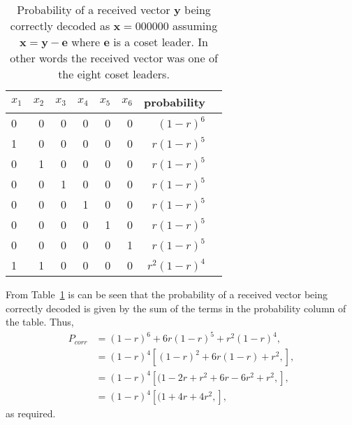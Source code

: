 \begin{table}[!htp]\centering
\begin{tabular}{lrrrrr|rr}\toprule
$x_1$ &$x_2$ &$x_3$ &$x_4$ &$x_5$ &$x_6$ &probability \\\midrule
0 &0 &0 &0 &0 &0 &$(1-r)^6$ \\
1 &0 &0 &0 &0 &0 &$r(1-r)^5$ \\
0 &1 &0 &0 &0 &0 &$r(1-r)^5$ \\
0 &0 &1 &0 &0 &0 &$r(1-r)^5$ \\
0 &0 &0 &1 &0 &0 &$r(1-r)^5$ \\
0 &0 &0 &0 &1 &0 &$r(1-r)^5$ \\
0 &0 &0 &0 &0 &1 &$r(1-r)^5$ \\
1 &1 &0 &0 &0 &0 &$r^2(1-r)^4$ \\
\bottomrule
\end{tabular}
\caption{Probability of a received vector $\bm{y}$ being correctly decoded as $\bm{x}=000000$ assuming $\bm{x} = \bm{y} - \bm{e}$ where $\bm{e}$ is a coset leader. In other words the received vector was one of the eight coset leaders.}
\label{tab:12}
\end{table}

From Table~\ref{tab:12} is can be seen that the probability of a received vector being correctly decoded is given by the sum of the terms in the probability column of the table. Thus,
\begin{align*}
	P_{corr} &=(1-r)^6 + 6r(1-r)^5 + r^2(1-r)^4,\\
	&=(1-r)^4\left[(1-r)^2 + 6r(1-r) + r^2,\right],\\
	&=(1-r)^4\left[(1-2r + r^2 + 6r-6r^2 + r^2,\right],\\
	&=(1-r)^4\left[(1+ 4r + 4r^2,\right],
\end{align*}
as required.

